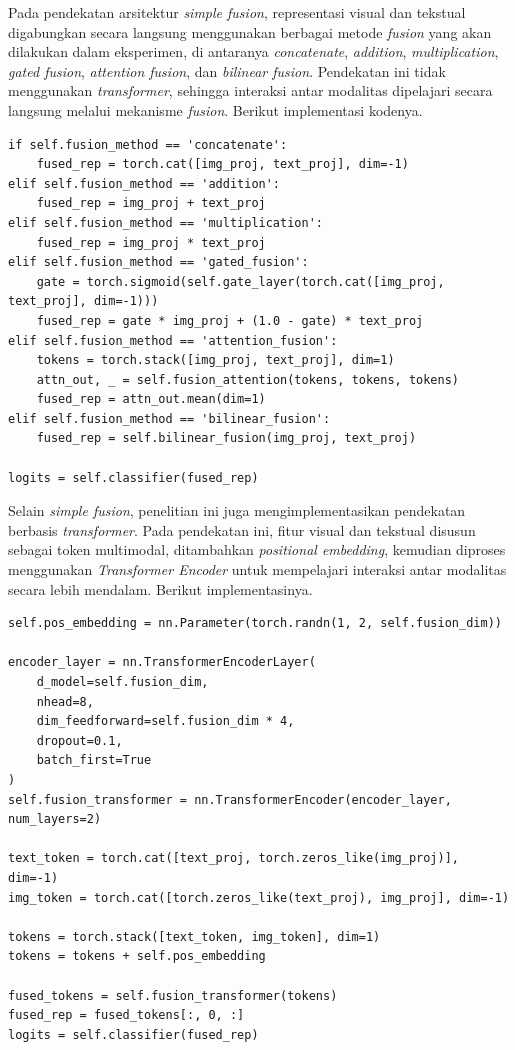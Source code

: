 Pada pendekatan arsitektur \textit{simple fusion}, representasi visual dan tekstual digabungkan secara langsung menggunakan berbagai metode \textit{fusion} yang akan dilakukan dalam eksperimen, di antaranya \textit{concatenate}, \textit{addition}, \textit{multiplication}, \textit{gated fusion}, \textit{attention fusion}, dan \textit{bilinear fusion}. Pendekatan ini tidak menggunakan \textit{transformer}, sehingga interaksi antar modalitas dipelajari secara langsung melalui mekanisme \textit{fusion}. Berikut implementasi kodenya.

\begin{lstlisting}[caption={Kode simple fusion pada model multimodal}, label={code:4.multimodal_simple_fusion}]
if self.fusion_method == 'concatenate':
    fused_rep = torch.cat([img_proj, text_proj], dim=-1)
elif self.fusion_method == 'addition':
    fused_rep = img_proj + text_proj
elif self.fusion_method == 'multiplication':
    fused_rep = img_proj * text_proj
elif self.fusion_method == 'gated_fusion':
    gate = torch.sigmoid(self.gate_layer(torch.cat([img_proj, text_proj], dim=-1)))
    fused_rep = gate * img_proj + (1.0 - gate) * text_proj
elif self.fusion_method == 'attention_fusion':
    tokens = torch.stack([img_proj, text_proj], dim=1)
    attn_out, _ = self.fusion_attention(tokens, tokens, tokens)
    fused_rep = attn_out.mean(dim=1)
elif self.fusion_method == 'bilinear_fusion':
    fused_rep = self.bilinear_fusion(img_proj, text_proj)

logits = self.classifier(fused_rep)
\end{lstlisting}

Selain \textit{simple fusion}, penelitian ini juga mengimplementasikan pendekatan berbasis \textit{transformer}. Pada pendekatan ini, fitur visual dan tekstual disusun sebagai token multimodal, ditambahkan \textit{positional embedding}, kemudian diproses menggunakan \textit{Transformer Encoder} untuk mempelajari interaksi antar modalitas secara lebih mendalam. Berikut implementasinya.

\begin{lstlisting}[caption={Kode transformer fusion pada model multimodal}, label={code:4.multimodal_transformer_fusion}]
self.pos_embedding = nn.Parameter(torch.randn(1, 2, self.fusion_dim))

encoder_layer = nn.TransformerEncoderLayer(
    d_model=self.fusion_dim,
    nhead=8,
    dim_feedforward=self.fusion_dim * 4,
    dropout=0.1,
    batch_first=True
)
self.fusion_transformer = nn.TransformerEncoder(encoder_layer, num_layers=2)

text_token = torch.cat([text_proj, torch.zeros_like(img_proj)], dim=-1)
img_token = torch.cat([torch.zeros_like(text_proj), img_proj], dim=-1)

tokens = torch.stack([text_token, img_token], dim=1)
tokens = tokens + self.pos_embedding

fused_tokens = self.fusion_transformer(tokens)
fused_rep = fused_tokens[:, 0, :]
logits = self.classifier(fused_rep)
\end{lstlisting}

